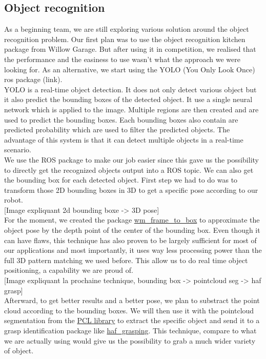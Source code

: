 \documentclass[runningheads,a4paper]{llncs}
\begin{document}
\subsection{Object recognition}
\tab As a beginning team, we are still exploring various solution around the object recognition problem. Our first plan was to use the object recognition kitchen package from Willow Garage. But after using it in competition, we realised that the performance and the easiness to use wasn’t what the approach we were looking for. As an alternative, we start using the YOLO (You Only Look Once) ros package (link). \\

YOLO is a real-time object detection. It does not only detect various object but it also predict the bounding boxes of the detected object. It use a single neural network which is applied to the image. Multiple regions are then created and are used to predict the bounding boxes. Each bounding boxes also contain are predicted probability which are used to filter the predicted objects. The advantage of this system is that it can detect multiple objects in a real-time scenario.\\
 
We use the ROS package to make our job easier since this gave us the possibility to directly get the recognized objects output into a ROS topic. We can also get the bounding box for each detected object. First step we had to do was to transform those 2D bounding boxes in 3D to get a specific pose according to our robot. \\

[Image expliquant 2d bounding boxe -> 3D pose]\\

For the moment, we created the package \href{https://github.com/WalkingMachine/wm_frame_to_box}{wm\_frame\_to\_box} to approximate the object pose by the depth point of the center of the bounding box. Even though it can have flaws, this technique has also proven to be largely sufficient for most of our applications and most importantly, it uses way less processing power than the full 3D pattern matching we used before. This allow us to do real time object positioning, a capability we are proud of.\\

[Image expliquant la prochaine technique, bounding box -> pointcloud seg -> haf grasp] \\

Afterward, to get better results and a better pose, we plan to substract the point cloud according to the bounding boxes. We will then use it with the pointcloud segmentation from the \href{http://pointclouds.org}{PCL library} to extract the specific object and send it to a grasp identification package like \href{http://http://wiki.ros.org/haf_grasping}{haf\_grasping}. This technique, compare to what we are actually using would give us the possibility to grab a much wider variety of object.\\
\end{document}
